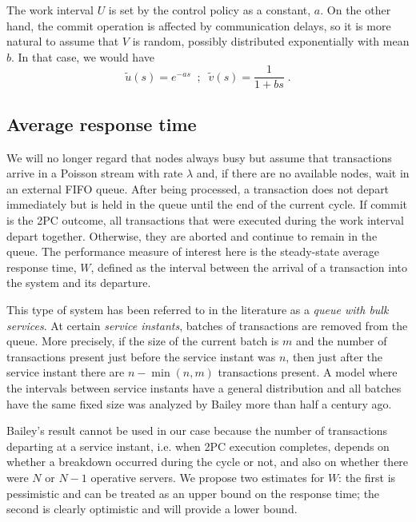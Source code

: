 The work interval $U$ is set by the control policy as a
constant, $a$. On the other hand, the commit operation is affected by
communication delays, so it is more natural to assume that $V$ is random,
possibly distributed exponentially with mean $b$. In that case, we would
have
\begin{equation}
\tilde{u}(s) = e^{-as}\;\;;\;\;\tilde{v}(s) = \frac{1}{1+bs}\;.
\end{equation}

\subsection{Average response time}
\label{sec:av-resp-time}

We will no longer regard that nodes always busy but assume that transactions arrive in a Poisson stream with rate
$\lambda$ and,
if there are no available nodes, wait in 
an external FIFO queue. After
being processed, a transaction does not depart immediately but is held in the queue until the
end of the current cycle. If commit is the 2PC outcome, all transactions that were
executed during the work interval depart together. Otherwise, they are aborted and continue to remain in the queue. The performance measure of interest here is the steady-state average
response time, $W$, defined as the interval between the arrival of a transaction into the
system and its departure.

This type of system has been referred to in the literature as a \emph{queue with bulk
  services}. At certain \emph{service instants}, batches of transactions are removed
from the queue. More precisely, if the size of the current batch is $m$ and the number
of transactions present just before the service instant was $n$, then just after the
service instant there are $n-\min(n,m)$ transactions present. A model where the
intervals between service instants have a general distribution and all batches
have the same fixed size was analyzed by Bailey \cite{bailey} more than half a
century ago.

Bailey's result cannot be used in our case because the number of transactions
departing at a service instant, i.e. when 2PC execution completes, depends
on whether a breakdown occurred during the cycle or not, and also on whether
there were $N$ or $N-1$ operative servers. We propose two estimates for
$W$: the first is pessimistic and can be treated as an upper bound on the
response time; the second is clearly optimistic and will provide a lower bound.

